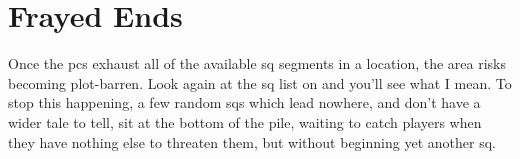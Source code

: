 \section{Frayed Ends}

Once the \glspl{pc} exhaust all of the available \gls{sq} \glspl{segment} in a location, the area risks becoming plot-barren.
Look again at the \gls{sq} list on  and you'll see what I mean.
To stop this happening, a few random \glspl{sq} which lead nowhere, and don't have a wider tale to tell, sit at the bottom of the pile, waiting to catch players when they have nothing else to threaten them, but without beginning yet another \gls{sq}.
